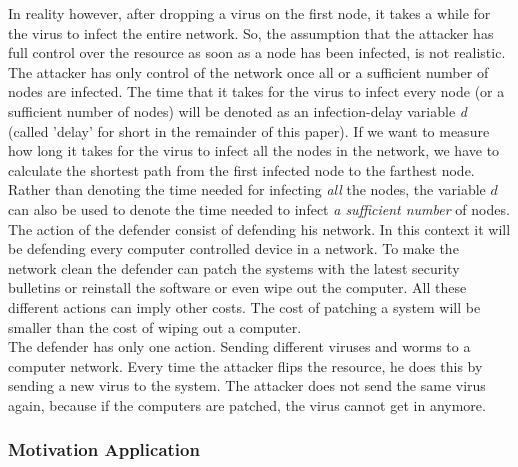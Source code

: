 In reality however, after dropping a virus on the first node, it takes a while for the virus to infect
the entire network. So, the assumption that the attacker has full control over the resource as soon as a node has been infected, is not realistic. The attacker has only control of the network once all or a sufficient number of nodes are infected. 
The time that it takes for the virus to infect every node (or a sufficient number of nodes) will be
denoted as an infection-delay variable \textit{d} (called 'delay' for short in the remainder of this paper). If we want to measure how long it takes for the virus to
infect all the nodes in the network, we have to calculate the shortest path from the
first infected node to the farthest node. Rather than denoting the time needed for infecting \textit{all} the nodes, the variable $d$ can also be used to denote the time needed to infect \textit{a sufficient number} of nodes. \\

The action of the defender consist of defending his network. In this context it will be defending every computer controlled device in a network. To make the network clean the defender can patch the systems with the latest security bulletins or reinstall the software or even wipe out the computer. All these different actions can imply other costs. The cost of patching a system will be smaller than the cost of wiping out a computer. \\
The defender has only one action. Sending different viruses and worms to a computer network. Every time the attacker flips the resource, he does this by sending a new virus to the system. The attacker does not send the same virus again, because if the computers are patched, the virus cannot get in anymore. 

\subsubsection{Motivation Application}
